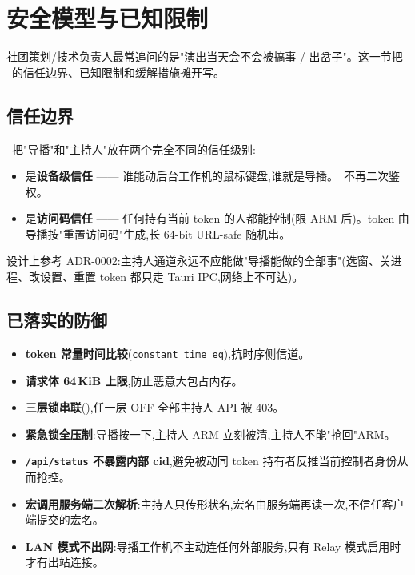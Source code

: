 \section{安全模型与已知限制}

社团策划/技术负责人最常追问的是"演出当天会不会被搞事 / 出岔子"。这一节把\,\app\ 的信任边界、已知限制和缓解措施摊开写。

\subsection{信任边界}

\app\ 把"导播"和"主持人"放在两个完全不同的信任级别:

\begin{itemize}
  \item {}是\textbf{设备级信任} —— 谁能动后台工作机的鼠标键盘,谁就是导播。\app\ 不再二次鉴权。
  \item {}是\textbf{访问码信任} —— 任何持有当前 token 的人都能控制(限 ARM 后)。token 由导播按"重置访问码"生成,长 64-bit URL-safe 随机串。
\end{itemize}

设计上参考 ADR-0002:主持人通道永远不应能做"导播能做的全部事"(选窗、关进程、改设置、重置 token 都只走 Tauri IPC,网络上不可达)。

\subsection{已落实的防御}

\begin{itemize}
  \item \textbf{token 常量时间比较}(\texttt{constant\_time\_eq}),抗时序侧信道。
  \item \textbf{请求体 64\,KiB 上限},防止恶意大包占内存。
  \item \textbf{三层锁串联}(),任一层 OFF 全部主持人 API 被 403。
  \item \textbf{紧急锁全压制}:导播按一下,主持人 ARM 立刻被清,主持人不能"抢回"ARM。
  \item \textbf{\texttt{/api/status} 不暴露内部 cid},避免被动同 token 持有者反推当前控制者身份从而抢控。
  \item \textbf{宏调用服务端二次解析}:主持人只传形状名,宏名由服务端再读一次,不信任客户端提交的宏名。
  \item \textbf{LAN 模式不出网}:导播工作机不主动连任何外部服务,只有 Relay 模式启用时才有出站连接。
\end{itemize}

